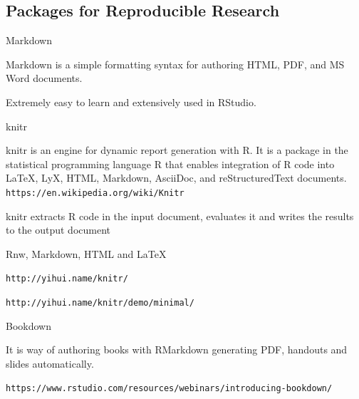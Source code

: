 \documentclass{beamer}
\begin{document}

\subsection[Packages]{Packages for Reproducible Research}


\begin{frame}{Markdown} %

Markdown is a simple formatting syntax for authoring HTML, PDF, and MS Word documents. 

Extremely easy to learn and extensively used in RStudio.

\end{frame}


\begin{frame}{knitr} %

knitr is an engine for dynamic report generation with R. It is a package in the statistical programming language R that enables integration of R code into LaTeX, LyX, HTML, Markdown, AsciiDoc, and reStructuredText documents.
\texttt{https://en.wikipedia.org/wiki/Knitr}

knitr extracts R code in the input document, evaluates it and writes the results to the output document

Rnw, Markdown, HTML and LaTeX

\texttt{http://yihui.name/knitr/}

\texttt{http://yihui.name/knitr/demo/minimal/}


\end{frame}




\begin{frame}{Bookdown} %

It is way of authoring books with RMarkdown generating PDF, handouts and slides automatically.

\texttt{https://www.rstudio.com/resources/webinars/introducing-bookdown/}

\end{frame}


\end{document}
